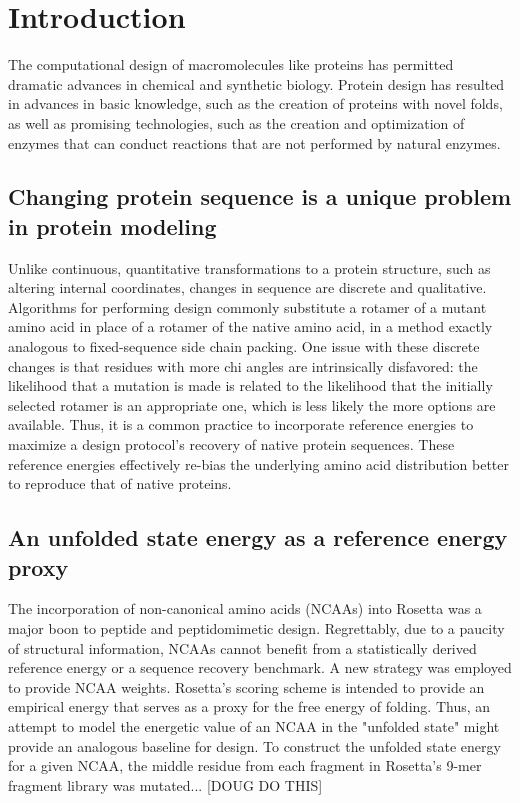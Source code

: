 \section{Introduction}
The computational design of macromolecules like proteins has permitted dramatic advances in chemical and synthetic biology.
Protein design has resulted in advances in basic knowledge, such as the creation of proteins with novel folds, as well as promising technologies, such as the creation and optimization of enzymes that can conduct reactions that are not performed by natural enzymes.
\subsection{Changing protein sequence is a unique problem in protein modeling}
Unlike continuous, quantitative transformations to a protein structure, such as altering internal coordinates, changes in sequence are discrete and qualitative.
Algorithms for performing design commonly substitute a rotamer of a mutant amino acid in place of a rotamer of the native amino acid, in a method exactly analogous to fixed-sequence side chain packing.
One issue with these discrete changes is that residues with more chi angles are intrinsically disfavored: the likelihood that a mutation is made is related to the likelihood that the initially selected rotamer is an appropriate one, which is less likely the more options are available.
Thus, it is a common practice to incorporate reference energies to maximize a design protocol's recovery of native protein sequences. These reference energies effectively re-bias the underlying amino acid distribution better to reproduce that of native proteins.
\subsection{An unfolded state energy as a reference energy proxy}
The incorporation of non-canonical amino acids (NCAAs) into Rosetta was a major boon to peptide and peptidomimetic design. 
Regrettably, due to a paucity of structural information, NCAAs cannot benefit from a statistically derived reference energy or a sequence recovery benchmark. 
A new strategy was employed to provide NCAA weights. Rosetta's scoring scheme is intended to provide an empirical energy that serves as a proxy for the free energy of folding. 
Thus, an attempt to model the energetic value of an NCAA in the "unfolded state" might provide an analogous baseline for design. 
To construct the unfolded state energy for a given NCAA, the middle residue from each fragment in Rosetta's 9-mer fragment library was mutated... [DOUG DO THIS]
